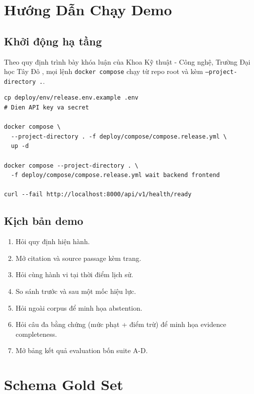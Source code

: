 \documentclass[a4paper,12pt]{extreport}
\newcommand{\code}[1]{\texttt{#1}}
\begin{document}
\appendix

\chapter{Hướng Dẫn Chạy Demo}

\section{Khởi động hạ tầng}

Theo quy định trình bày khóa luận của Khoa Kỹ thuật - Công nghệ, Trường Đại học Tây Đô \cite{taydo2024format}, mọi lệnh \code{docker compose} chạy từ repo root và kèm \code{--project-directory .}.

\begin{lstlisting}[caption={Khởi động defense mode}]
cp deploy/env/release.env.example .env
# Dien API key va secret

docker compose \
  --project-directory . -f deploy/compose/compose.release.yml \
  up -d

docker compose --project-directory . \
  -f deploy/compose/compose.release.yml wait backend frontend

curl --fail http://localhost:8000/api/v1/health/ready
\end{lstlisting}

\section{Kịch bản demo}

\begin{enumerate}
  \item Hỏi quy định hiện hành.
  \item Mở citation và source passage kèm trang.
  \item Hỏi cùng hành vi tại thời điểm lịch sử.
  \item So sánh trước và sau một mốc hiệu lực.
  \item Hỏi ngoài corpus để minh họa abstention.
  \item Hỏi câu đa bằng chứng (mức phạt + điểm trừ) để minh họa evidence completeness.
  \item Mở bảng kết quả evaluation bốn suite A-D.
\end{enumerate}

\chapter{Schema Gold Set}
\end{document}
